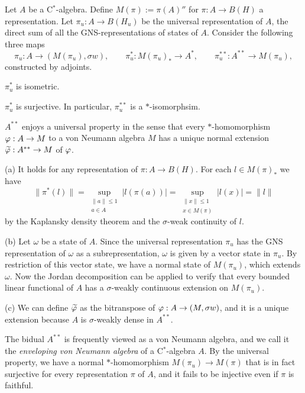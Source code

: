 \documentclass{../../large}
\begin{document}
\begin{prb}
Let $A$ be a C$^*$-algebra.
Define $M(\pi):=\pi(A)''$ for $\pi:A\to B(H)$ a representation.
Let $\pi_u:A\to B(H_u)$ be the universal representation of $A$, the direct sum of all the GNS-representations of states of $A$.
Consider the following three maps
\[\pi_u:A\to(M(\pi_u),\sigma w),\qquad\pi_u^*:M(\pi_u)_*\to A^*,\qquad\pi_u^{**}:A^{**}\to M(\pi_u),\]
constructed by adjoints.
\begin{parts}
\item $\pi_u^*$ is isometric.
\item $\pi_u^*$ is surjective.
In particular, $\pi_u^{**}$ is a $*$-isomorphsim.
\item $A^{**}$ enjoys a universal property in the sense that every $*$-homomorphism $\varphi:A\to M$ to a von Neumann algebra $M$ has a unique normal extension $\widetilde{\varphi}:A^{**}\to M$ of $\varphi$.
\end{parts}
\end{prb}
\begin{pf}
(a)
It holds for any representation of $\pi:A\to B(H)$.
For each $l\in M(\pi)_*$ we have
\[\|\pi^*(l)\|=\sup_{\substack{\|a\|\le1\\a\in A}}|l(\pi(a))|=\sup_{\substack{\|x\|\le1\\x\in M(\pi)}}|l(x)|=\|l\|\] by the Kaplansky density theorem and the $\sigma$-weak continuity of $l$.

(b)
Let $\omega$ be a state of $A$.
Since the universal representation $\pi_u$ has the GNS representation of $\omega$ as a subrepresentation, $\omega$ is given by a vector state in $\pi_u$.
By restriction of this vector state, we have a normal state of $M(\pi_u)$, which extends $\omega$.
Now the Jordan decomposition can be applied to verify that every bounded linear functional of $A$ has a $\sigma$-weakly continuous extension on $M(\pi_u)$.

(c)
We can define $\widetilde{\varphi}$ as the bitranspose of $\varphi:A\to(M,\sigma w)$, and it is a unique extension because $A$ is $\sigma$-weakly dense in $A^{**}$.
\end{pf}
\begin{rmk}
The bidual $A^{**}$ is frequently viewed as a von Neumann algebra, and we call it the \emph{enveloping von Neumann algebra} of a C$^*$-algebra $A$.
By the universal property, we have a normal $*$-homomorphism $M(\pi_u)\to M(\pi)$ that is in fact surjective for every representation $\pi$ of $A$, and it fails to be injective even if $\pi$ is faithful.
\end{rmk}
\end{document}
